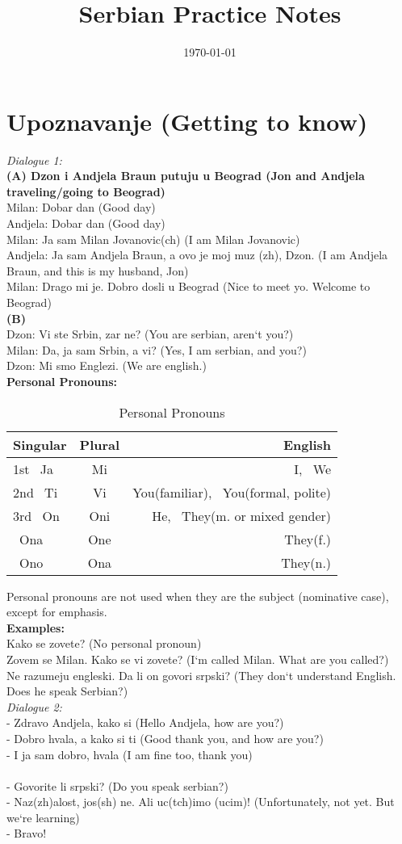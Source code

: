 \documentclass[12pt,
               a4paper,
               article,
               oneside,
               english,oldfontcommands]{memoir}
\date{\today}
\title{Serbian Practice Notes}
\newcommand{\spaze}{\vspace{4mm}\\}
\begin{document}
\header{}
\section*{Upoznavanje (Getting to know)}
\emph{Dialogue 1:}\spaze
\textbf{(A) Dzon i Andjela Braun putuju u Beograd (Jon and Andjela traveling/going to Beograd)} \spaze
Milan: Dobar dan (Good day)\\[3pt]
Andjela: Dobar dan (Good day) \\[3pt]
Milan: Ja sam Milan Jovanovic(ch) (I am Milan Jovanovic) \\[3pt]
Andjela: Ja sam Andjela Braun, a ovo je moj muz (zh), Dzon. (I am Andjela Braun, and this is my husband, Jon) \\ [3pt]
Milan: Drago mi je. Dobro dosli u Beograd (Nice to meet yo. Welcome to Beograd) \spaze 
\textbf{(B)} \spaze
Dzon: Vi ste Srbin, zar ne? (You are serbian, aren`t you?) \\[3pt]
Milan: Da, ja sam Srbin, a vi? (Yes, I am serbian, and you?) \\[3pt]
Dzon: Mi smo Englezi. (We are english.) \spaze 
\textbf{Personal Pronouns:}
\begin{table}[H]
    \begin{center}
      \caption{Personal Pronouns}
      \begin{tabular}{l|S|r}
        \toprule %
        \textbf{Singular} & \textbf{Plural} & \textbf{English}\\
        \midrule %
        1st \ Ja  & Mi & I, \ We\\[4pt]
        2nd \ Ti & Vi & You(familiar), \ You(formal, polite)\\[4pt]
        3rd \ On & Oni & He, \ They(m. or mixed gender)\\[4pt]
        \ Ona & {One} & They(f.)\\[4pt]
        \ Ono & {Ona} & They(n.)\\[4pt]
        \bottomrule %
      \end{tabular}
    \end{center}
  \end{table}
  Personal pronouns are not used when they are the subject (nominative case), except for emphasis.\spaze 
  \textbf{Examples:}\spaze 
  Kako se zovete? (No personal pronoun) \\[3pt]
  Zovem se Milan. Kako se vi zovete? (I`m called Milan. What are you called?)\\[3pt]
  Ne razumeju engleski. Da li on govori srpski? (They don`t understand English. Does he speak Serbian?) \spaze 
  \emph{Dialogue 2:} \spaze 
  - Zdravo Andjela, kako si (Hello Andjela, how are you?) \spaze 
  - Dobro hvala, a kako si ti (Good thank you, and how are you?) \spaze 
  - I ja sam dobro, hvala (I am fine too, thank you) \spaze  
  \spaze 
  - Govorite li srpski? (Do you speak serbian?) \spaze 
  - Naz(zh)alost, jos(sh) ne. Ali uc(tch)imo (ucim)! (Unfortunately, not yet. But we`re learning) \spaze 
  - Bravo! \spaze 
\end{document}
